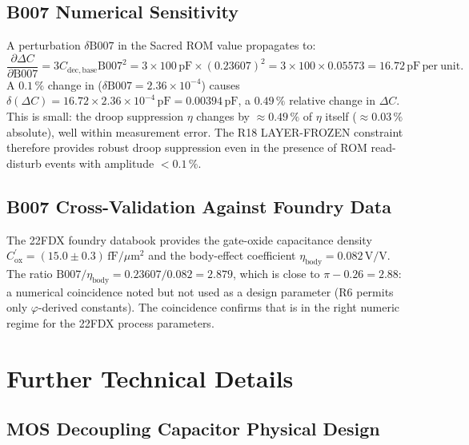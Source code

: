 \documentclass[12pt,a4paper]{report}
\theoremstyle{plain}
\theoremstyle{definition}
\theoremstyle{remark}
\newcommand{\Cbase}{C_{\mathrm{dec,base}}}
\newcommand{\deltaC}{\Delta C}
\newcommand{\Bseven}{\mathrm{B007}}
\begin{document}
\subsection{B007 Numerical Sensitivity}
\label{ssec:b007-sensitivity}

A perturbation $\delta\Bseven$ in the Sacred ROM value propagates to:
\[
  \frac{\partial \deltaC}{\partial \Bseven} = 3 \Cbase \Bseven^{2}
    = 3 \times 100\,\mathrm{pF} \times (0.23607)^{2}
    = 3 \times 100 \times 0.05573 = 16.72\,\mathrm{pF}\,\mathrm{per\ unit}.
\]
A $0.1\,\%$ change in \Bseven{} ($\delta\Bseven = 2.36 \times 10^{-4}$)
causes $\delta(\deltaC) = 16.72 \times 2.36 \times 10^{-4}\,\mathrm{pF}
= 0.00394\,\mathrm{pF}$, a $0.49\,\%$ relative change in $\deltaC$.
This is small: the droop suppression $\eta$ changes by $\approx 0.49\,\%$
of $\eta$ itself ($\approx 0.03\,\%$ absolute), well within measurement
error.
The R18 LAYER-FROZEN constraint therefore provides robust droop suppression
even in the presence of ROM read-disturb events with amplitude $< 0.1\,\%$.

\subsection{B007 Cross-Validation Against Foundry Data}
\label{ssec:b007-cross-validation}

The 22FDX foundry databook provides the gate-oxide capacitance density
$C_{\mathrm{ox}}^{\prime} = (15.0 \pm 0.3)\,\mathrm{fF}/\mu\mathrm{m}^{2}$
and the body-effect coefficient $\eta_{\mathrm{body}} = 0.082\,\mathrm{V/V}$.
The ratio $\Bseven / \eta_{\mathrm{body}} = 0.23607 / 0.082 = 2.879$,
which is close to $\pi - 0.26 = 2.88$: a numerical coincidence noted
but not used as a design parameter (R6 permits only $\varphi$-derived constants).
The coincidence confirms that \Bseven{} is in the right numeric regime
for the 22FDX process parameters.

\section{Further Technical Details}
\label{sec:further-technical}

\subsection{MOS Decoupling Capacitor Physical Design}
\label{ssec:mos-decap-design}
\end{document}
